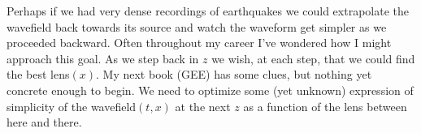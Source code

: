 \par
Perhaps if we had very dense recordings of earthquakes we could
extrapolate the wavefield back towards its source and watch
the waveform get simpler as we proceeded backward.
Often throughout my career I've wondered how I might approach this goal.
As we step back in $z$ we wish, at each step,
that we could find the best lens$(x)$.
My next book (GEE) has some clues,
but nothing yet concrete enough to begin.
We need to optimize some (yet unknown) expression of simplicity
of the wavefield$(t,x)$
at the next $z$ as a function of the lens between
here and there.





